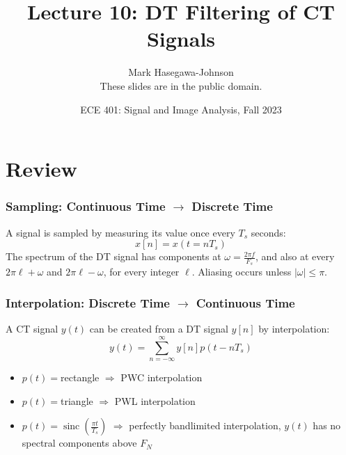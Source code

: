 \documentclass{beamer}
\title{Lecture 10: DT Filtering of CT Signals}
\author{Mark Hasegawa-Johnson\\These slides are in the public domain.}
\date{ECE 401: Signal and Image Analysis, Fall 2023}
\DeclareMathOperator{\sinc}{sinc}
\begin{document}
\begin{frame}
  \maketitle
\end{frame}

\begin{frame}
  \tableofcontents
\end{frame}

\section{Review}
\setcounter{subsection}{1}

\begin{frame}
  \frametitle{Sampling: Continuous Time $\rightarrow$ Discrete Time}

  A signal is sampled by measuring its value once every $T_s$ seconds:
  \begin{displaymath}
    x[n] = x(t=nT_s)
  \end{displaymath}
  The spectrum of the DT signal has components at $\omega=\frac{2\pi
    f}{F_s}$, and also at every $2\pi\ell+\omega$ and $2\pi\ell-\omega$, for
  every integer $\ell$.  Aliasing occurs unless $|\omega|\le\pi$.
\end{frame}


\begin{frame}
  \frametitle{Interpolation: Discrete Time $\rightarrow$ Continuous Time}

  A CT signal $y(t)$ can be created from a DT signal $y[n]$ by interpolation:
  \begin{displaymath}
    y(t) = \sum_{n=-\infty}^\infty y[n]p(t-nT_s)
  \end{displaymath}
  \begin{itemize}
  \item $p(t)=$rectangle $\Rightarrow$ PWC interpolation
  \item $p(t)=$triangle $\Rightarrow$ PWL interpolation
  \item $p(t)=\sinc\left(\frac{\pi t}{T_s}\right)$ $\Rightarrow$ perfectly bandlimited interpolation,
    $y(t)$ has no spectral components above $F_N$
  \end{itemize}
\end{frame}
\end{document}
